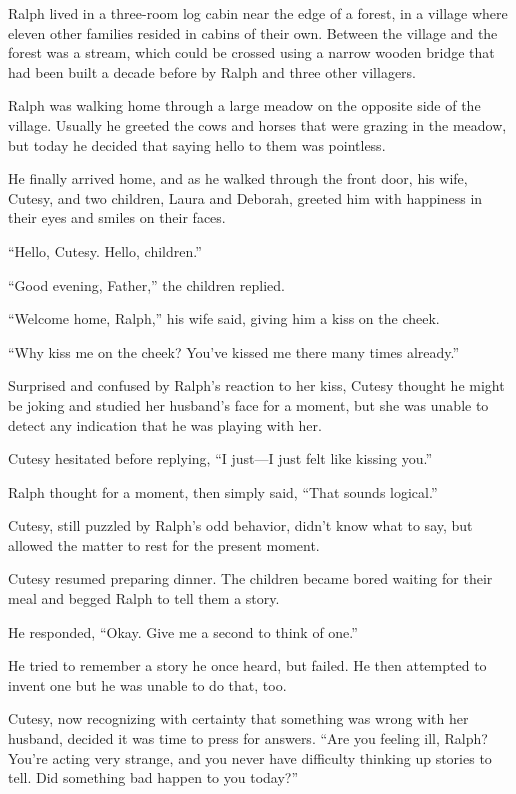\timesep

Ralph lived in a three-room log cabin near the edge of a forest, in a village where eleven other families resided in cabins of their own. Between the village and the forest was a stream, which could be crossed using a narrow wooden bridge that had been built a decade before by Ralph and three other villagers.

Ralph was walking home through a large meadow on the opposite side of the village. Usually he greeted the cows and horses that were grazing in the meadow, but today he decided that saying hello to them was pointless.

He finally arrived home, and as he walked through the front door, his wife, Cutesy, and two children, Laura and Deborah, greeted him with happiness in their eyes and smiles on their faces.

“Hello, Cutesy. Hello, children.”

“Good evening, Father,” the children replied.

“Welcome home, Ralph,” his wife said, giving him a kiss on the cheek.

“Why kiss me on the cheek? You've kissed me there many times already.”

Surprised and confused by Ralph's reaction to her kiss, Cutesy thought he might be joking and studied her husband's face for a moment, but she was unable to detect any indication that he was playing with her.

Cutesy hesitated before replying, “I just—I just felt like kissing you.”

Ralph thought for a moment, then simply said, “That sounds logical.”

Cutesy, still puzzled by Ralph's odd behavior, didn't know what to say, but allowed the matter to rest for the present moment.

Cutesy resumed preparing dinner. The children became bored waiting for their meal and begged Ralph to tell them a story.

He responded, “Okay. Give me a second to think of one.”

He tried to remember a story he once heard, but failed. He then attempted to invent one but he was unable to do that, too.

Cutesy, now recognizing with certainty that something was wrong with her husband, decided it was time to press for answers. “Are you feeling ill, Ralph? You're acting very strange, and you never have difficulty thinking up stories to tell. Did something bad happen to you today?”


